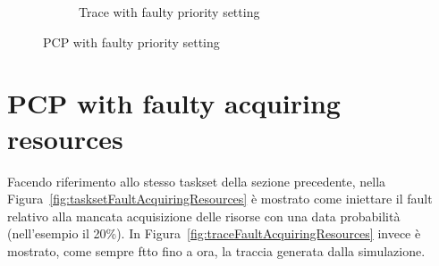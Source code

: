 \begin{figure}[htbp]
\begin{subfigure}{0.45\textwidth}
{        }
        \caption{Trace with faulty priority setting}
        \label{fig:traceFaultSetPriority}
        \vfill
    \end{subfigure}
    \caption{PCP with faulty priority setting}
\end{figure}

\section{PCP with faulty acquiring resources}
Facendo riferimento allo stesso taskset della sezione precedente, nella Figura~\ref{fig:tasksetFaultAcquiringResources} è mostrato come iniettare il fault relativo alla mancata acquisizione delle risorse con una data probabilità (nell'esempio il 20\%). In Figura~\ref{fig:traceFaultAcquiringResources} invece è mostrato, come sempre ftto fino a ora, la traccia generata dalla simulazione.

